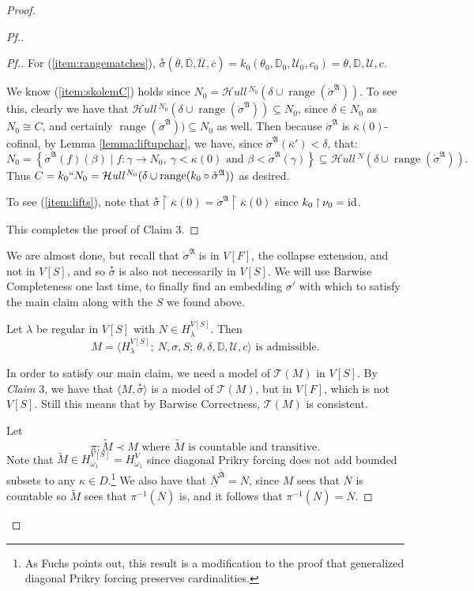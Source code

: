 \documentclass{amsart}
\theoremstyle{definition}
\theoremstyle{remark}
\newcommand{\D}{\mathbb{D}}
\newcommand{\N}{{\overline{N}}}
\newcommand{\U}{\mathcal{U}}
\newcommand{\id}{\textup{\ensuremath{\text{id}}}}
\DeclareMathOperator{\ran}{range}
\newcommand{\st}{\; | \;}
\newcommand{\set}[2]{\left\{#1\st #2 \right\}}
\newcommand{\rest}{\mathbin{\upharpoonright}}
\newcommand{\SH}{\mathcal{H}\textit{ull} \,}
\newcommand{\sk}[3]{\SH^{#1}( {#2} \cup {\ran(#3)} ) }
\begin{document}
\begin{proof}
\begin{proof}[Pf.]
\begin{proof}[Pf.]
For (\ref{item:rangematches}), $\overset{*} {\sigma}(\overline \theta, \overline{\D}, \overline{\U}, \overline c)= k_0(\theta_0, \D_0, \U_0, c_0) =\theta, \D, \U, c$.

We know (\ref{item:skolemC}) holds since $N_0 = \sk{N_0}{\delta}{\mathring \sigma^{\mathfrak A}}$. To see this, clearly we have that $\sk{N_0}{\delta}{\mathring \sigma^{\mathfrak A}} \subseteq N_0$, since $\delta \in N_0$ as $N_0 \cong C$, and certainly $\ran(\mathring \sigma^{\mathfrak A})) \subseteq N_0$ as well. 
Then because $\mathring \sigma^{\mathfrak A}$ is $\overline \kappa(0)$-cofinal, by Lemma \ref{lemma:liftupchar}, we have, since $\mathring \sigma^{\mathfrak A}(\overline \kappa') < \delta$, that:
$$N_0 = \set{\mathring \sigma^{\mathfrak A}(f)(\beta)}{ f: \gamma \longrightarrow N_0, \ \gamma < \overline \kappa(0) \text{ and } \beta < \mathring \sigma^{\mathfrak A}(\gamma) } \subseteq \sk{N}{\delta}{\mathring \sigma^{\mathfrak A}}.$$
Thus $C = k_0``N_0=\sk{N_0}{\delta}{k_0 \circ \mathring \sigma^{\mathfrak A}}$ as desired. 

To see (\ref{item:lifts}), note that $\overset{*} {\sigma} \rest \overline \kappa(0) = \mathring{\sigma}^{\mathfrak A} \rest \overline \kappa(0)$ since $k_0 \rest \nu_0 = \id$.

This completes the proof of Claim 3.
\end{proof}

We are almost done, but recall that $\mathring{\sigma}^{\mathfrak A}$ is in $V[F]$, the collapse extension, and not in $V[S]$, and so $\overset{*} {\sigma}$ is also not necessarily in $V[S]$. We will use Barwise Completeness one last time, to finally find an embedding $\sigma'$ with which to satisfy the main claim along with the $S$ we found above.

Let $\lambda$ be regular in $V[S]$ with $N \in H_\lambda^{V[S]}$. Then 
	$$M = \langle H^{V[S]}_\lambda;\ N, \sigma, S;\ \theta, \delta, \D, \U, c \rangle \text{ is admissible.}$$

In order to satisfy our main claim, we need a model of $\mathcal T(M)$ in $V[S]$. By \textit{Claim} 3, we have that $\langle M , \overset{*} {\sigma}\rangle$ is a model of $\mathcal T(M)$, but in $V[F]$, which is not $V[S]$. Still this means that by Barwise Correctness, $\mathcal T(M)$ is consistent.
 
Let 
	$$\pi: \tilde M \prec M \text{ where $\tilde M$ is countable and transitive.}$$
Note that $\tilde M \in H_{\omega_1}^{V[S]}=H_{\omega_1}^V$ since diagonal Prikry forcing does not add bounded subsets to any $\kappa \in D$.\footnote{As Fuchs \cite{Fuchs:2005kx} points out, this result is a modification to the proof that generalized diagonal Prikry forcing preserves cardinalities.} 
We also have that $\overline{\underline N}^{\tilde{\mathfrak A}} = \N$, since $M$ sees that $\N$ is countable so $\tilde{M}$ sees that $\pi^{-1}(\N)$ is, and it follows that $\pi^{-1}(\N)=\N$.


\end{proof}
\end{proof}
\end{document}
